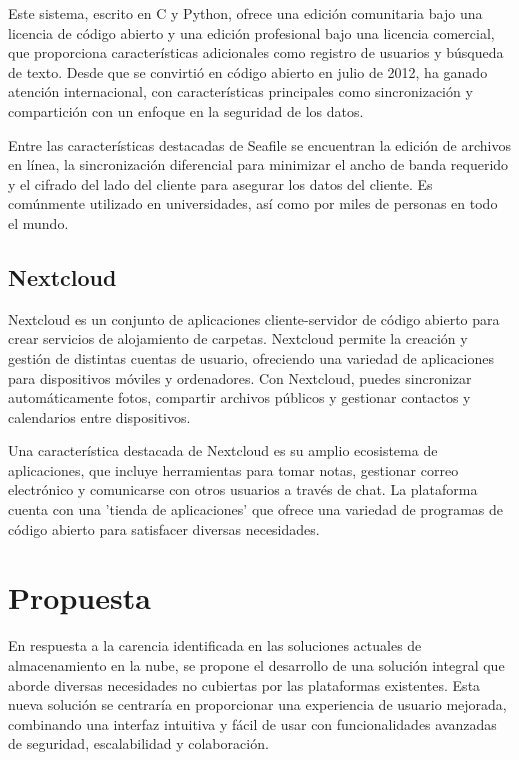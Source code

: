 Este sistema, escrito en C y Python, ofrece una edición comunitaria bajo una licencia de código abierto y una edición profesional bajo una licencia comercial, que proporciona características adicionales como registro de usuarios y búsqueda de texto. Desde que se convirtió en código abierto en julio de 2012, ha ganado atención internacional, con características principales como sincronización y compartición con un enfoque en la seguridad de los datos.

Entre las características destacadas de Seafile se encuentran la edición de archivos en línea, la sincronización diferencial para minimizar el ancho de banda requerido y el cifrado del lado del cliente para asegurar los datos del cliente. Es comúnmente utilizado en universidades, así como por miles de personas en todo el mundo.

\subsection{Nextcloud}

Nextcloud es un conjunto de aplicaciones cliente-servidor de código abierto para crear servicios de alojamiento de carpetas. Nextcloud permite la creación y gestión de distintas cuentas de usuario, ofreciendo una variedad de aplicaciones para dispositivos móviles y ordenadores. Con Nextcloud, puedes sincronizar automáticamente fotos, compartir archivos públicos y gestionar contactos y calendarios entre dispositivos.

Una característica destacada de Nextcloud es su amplio ecosistema de aplicaciones, que incluye herramientas para tomar notas, gestionar correo electrónico y comunicarse con otros usuarios a través de chat. La plataforma cuenta con una 'tienda de aplicaciones' que ofrece una variedad de programas de código abierto para satisfacer diversas necesidades.

\section{Propuesta}

En respuesta a la carencia identificada en las soluciones actuales de almacenamiento en la nube, se propone el desarrollo de una solución integral que aborde diversas necesidades no cubiertas por las plataformas existentes. Esta nueva solución se centraría en proporcionar una experiencia de usuario mejorada, combinando una interfaz intuitiva y fácil de usar con funcionalidades avanzadas de seguridad, escalabilidad y colaboración.

